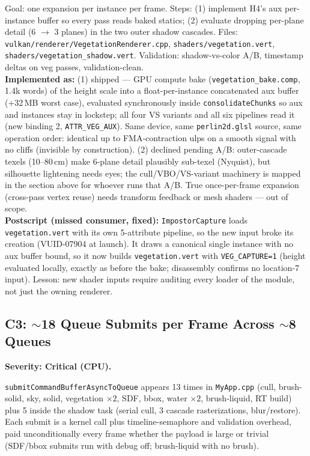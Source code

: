 \documentclass[11pt,a4paper]{article}
\begin{document}
\begin{tcolorbox}[promptbox={Prompt --- C2: stop re-expanding vegetation per pass}]
Goal: one expansion per instance per frame. Steps: (1) implement H4's aux
per-instance buffer so every pass reads baked statics; (2) evaluate dropping
per-plane detail (6 $\rightarrow$ 3 planes) in the two outer shadow
cascades. Files: \texttt{vulkan/renderer/VegetationRenderer.cpp},
\texttt{shaders/vegetation.vert},
\texttt{shaders/vegetation\_shadow.vert}. Validation: shadow-vs-color A/B,
timestamp deltas on veg passes, validation-clean.
\\ \textbf{Implemented as:} (1) shipped --- GPU compute bake
(\texttt{vegetation\_bake.comp}, 1.4k words) of the height scale into a
float-per-instance concatenated aux buffer (+32\,MB worst case), evaluated
synchronously inside \texttt{consolidateChunks} so aux and instances stay in
lockstep; all four VS variants and all six pipelines read it (new binding 2,
\texttt{ATTR\_VEG\_AUX}). Same device, same \texttt{perlin2d.glsl} source,
same operation order: identical up to FMA-contraction ulps on a smooth
signal with no cliffs (invisible by construction). (2) declined pending A/B:
outer-cascade texels (10--80\,cm) make 6-plane detail plausibly sub-texel
(Nyquist), but silhouette lightening needs eyes; the cull/VBO/VS-variant
machinery is mapped in the section above for whoever runs that A/B. True
once-per-frame expansion (cross-pass vertex reuse) needs transform feedback
or mesh shaders --- out of scope.
\\ \textbf{Postscript (missed consumer, fixed):} \texttt{ImpostorCapture}
loads \texttt{vegetation.vert} with its own 5-attribute pipeline, so the new
input broke its creation (VUID-07904 at launch). It draws a canonical single
instance with no aux buffer bound, so it now builds \texttt{vegetation.vert}
with \texttt{VEG\_CAPTURE=1} (height evaluated locally, exactly as before
the bake; disassembly confirms no location-7 input). Lesson: new shader
inputs require auditing every loader of the module, not just the owning
renderer.
\end{tcolorbox}

\subsection{C3: $\sim$18 Queue Submits per Frame Across $\sim$8 Queues}
\label{sec:c3}

\textbf{Severity: Critical (CPU).}

\texttt{submitCommandBufferAsyncToQueue} appears 13 times in
\texttt{MyApp.cpp} (cull, brush-solid, sky, solid, vegetation $\times 2$,
SDF, bbox, water $\times 2$, brush-liquid, RT build) plus 5 inside the
shadow task (serial cull, 3 cascade rasterizations, blur/restore). Each
submit is a kernel call plus timeline-semaphore and validation overhead,
paid unconditionally every frame whether the payload is large or trivial
(SDF/bbox submits run with debug off; brush-liquid with no brush).
\end{document}
